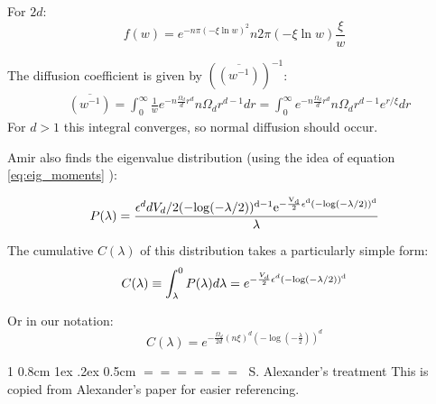 \documentclass[onecolumn,fleqn,notitlepage,secnumarabic]{revtex4}
\makeatletter
\newenvironment{fminipage}%
  {\begin{Sbox}\begin{minipage}}%
  {\end{minipage}\end{Sbox}\fbox{\TheSbox}}
\def\section{%
  \@startsection
    {section}%
    {1}%
    {\z@}%
    {0.8cm \@plus1ex \@minus .2ex}%
    {0.5cm}%
    {\Large\bf $=\!=\!=\!=\!=\!=\;$}%
}%
\makeatother
\begin{document}
For $2d$:
\[ f(w) = e^{-n \pi (-\xi\ln w)^2} n 2\pi  (-\xi\ln w)\frac{\xi}{w}\]

The diffusion coefficient is given by $\left(\overline{(w^{-1})}\right)^{-1}$:
\begin{align*}
    & \overline{(w^{-1})} = \int_0^\infty \frac{1}{w} e^{-n \frac{\Omega_d}{d} r^d} n\Omega_d r^{d-1} dr = \int_0^\infty e^{-n \frac{\Omega_d}{d} r^d} n\Omega_d r^{d-1}e^{r/\xi} dr 
\end{align*}
For $d>1$ this integral converges, so normal diffusion should occur.

Amir also finds the eigenvalue distribution (using the idea of equation \eqref{eq:eig_moments} ):

\begin{fminipage}{\textwidth}
\[ P(\lambda)=  \frac{\epsilon^d d V_d /2
(-\rm{log}(-\lambda/2))^{d-1} e^{-\frac{V_d}{2} \epsilon^d
(-\rm{log}(-\lambda/2))^d}}{\lambda} \]


The cumulative $C(\lambda)$ of this distribution takes a
particularly simple form: 
\[ C(\lambda)\equiv \int_\lambda^0
P(\lambda)d\lambda= e^{-\frac{V_d}{2} \epsilon^d
(-\rm{log}(-\lambda/2))^d} \]
\end{fminipage}
Or in our notation:
\[ C(\lambda)= e^{-\frac{\Omega_d}{2d} (n\xi)^d \left( -\log(-\frac{\lambda}{2})\right)^d}  \]
\section{S. Alexander's treatment}
This is copied from Alexander's paper for easier referencing. 
\end{document}
